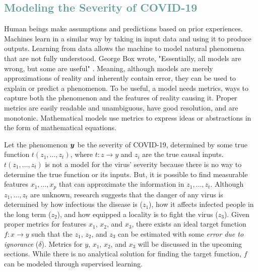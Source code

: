 \documentclass[12pt]{article}
\begin{document}

\textcolor{CadetBlue}{\section{Modeling the Severity of COVID-19}}

Human beings make assumptions and predictions based on prior experiences. Machines learn in a similar way by taking in input data and using it to produce outputs. Learning from data allows the machine to model natural phenomena that are not fully understood. George Box wrote, "Essentially, all models are wrong, but some are useful" \citeyear{box}. Meaning, although models are merely approximations of reality and inherently contain error, they can be used to explain or predict a phenomenon. To be useful, a model needs metrics, ways to capture both the phenomenon and the features of reality causing it. Proper metrics are easily readable and unambiguous, have good resolution, and are monotonic. Mathematical models use metrics to express ideas or abstractions in the form of mathematical equations. 

Let the phenomenon $\boldsymbol{y}$ be the severity of COVID-19, determined by some true function $t(z_1, \ldots, z_t)$, where $t: z \rightarrow y$ and $z_i$ are the true causal inputs. $t(z_1, \ldots, z_t)$ is not a model for the virus' severity because there is no way to determine the true function or its inputs. But, it is possible to find measurable features $x_1, \ldots, x_p$ that can approximate the information in $z_1, \ldots, z_t$. Although $z_1, \ldots, z_t$ are unknown, research suggests that the danger of any virus is determined by how infectious the disease is ($z_1$), how it affects infected people in the long term ($z_2$), and how equipped a locality is to fight the virus ($z_3$). Given proper metrics for features $x_1$, $x_2$, and $x_3$, there exists an ideal target function $f: x \rightarrow y$ such that the $z_1$, $z_2$, and $z_3$ can be estimated with some \emph{error due to ignorance} ($\delta$). Metrics for $y$, $x_1$, $x_2$, and $x_3$ will be discussed in the upcoming sections. While there is no analytical solution for finding the target function, $f$ can be modeled through supervised learning. 
\end{document}
